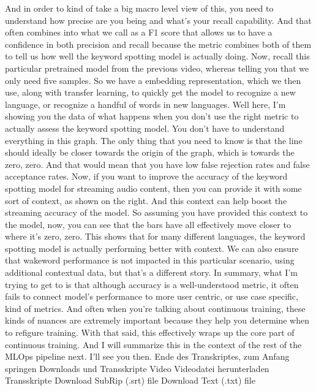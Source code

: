 {{{{     And in order to kind of take a big macro level view of this,
     you need to understand how precise are you being
     and what's your recall capability.
     And that often combines into what we call
     as a F1 score that allows us to have a confidence in both precision
     and recall because the metric combines both of them
     to tell us how well the keyword spotting model is actually doing.
     Now, recall this particular pretrained model
     from the previous video, whereas telling you that we only need five samples.
     So we have a embedding representation, which we then
     use, along with transfer learning, to quickly get the model
     to recognize a new language, or recognize
     a handful of words in new languages.
     Well here, I'm showing you the data of what
     happens when you don't use the right metric to actually assess
     the keyword spotting model.
     You don't have to understand everything in this graph.
     The only thing that you need to know is that the line should ideally
     be closer towards the origin of the graph, which is towards the zero, zero.
     And that would mean that you have low false rejection rates
     and false acceptance rates.
     Now, if you want to improve the accuracy of the keyword spotting model
     for streaming audio content, then you can provide it
     with some sort of context, as shown on the right.
     And this context can help boost the streaming accuracy of the model.
     So assuming you have provided this context to the model,
     now, you can see that the bars have all effectively move closer
     to where it's zero, zero.
     This shows that for many different languages,
     the keyword spotting model is actually performing better with context.
     We can also ensure that wakeword performance is not
     impacted in this particular scenario, using additional contextual data,
     but that's a different story.
     In summary, what I'm trying to get to is that although accuracy
     is a well-understood metric, it often fails
     to connect model's performance to more user centric, or use case specific,
     kind of metrics.
     And often when you're talking about continuous training,
     these kinds of nuances are extremely important because they help you
     determine when to refigure training.
     With that said, this effectively wraps up
     the core part of continuous training.
     And I will summarize this in the context of the rest of the MLOps pipeline next.
     I'll see you then.
     Ende des Transkriptes, zum Anfang springen
     Downloads und Transskripte
     Video
     Videodatei herunterladen
     Transskripte
     Download SubRip (.srt) file
     Download Text (.txt) file
 
}}}}
